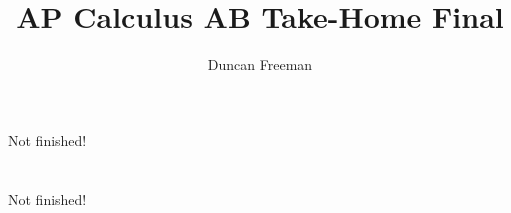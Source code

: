 \documentclass{article} \usepackage{pgfplots}
\title{ AP Calculus AB Take-Home Final }
\begin{document}
\author{
	Duncan Freeman
}

\maketitle


\pagebreak
\section{}


\pagebreak
\section{}


\pagebreak
\section{}


\pagebreak
\section{}


\pagebreak
\section{}


\pagebreak
\section{}


\pagebreak
\section{}
Not finished!

\pagebreak
\section{}


\pagebreak
\section{}


\pagebreak
\section{}
Not finished!

\pagebreak
\section{}

\end{document}
